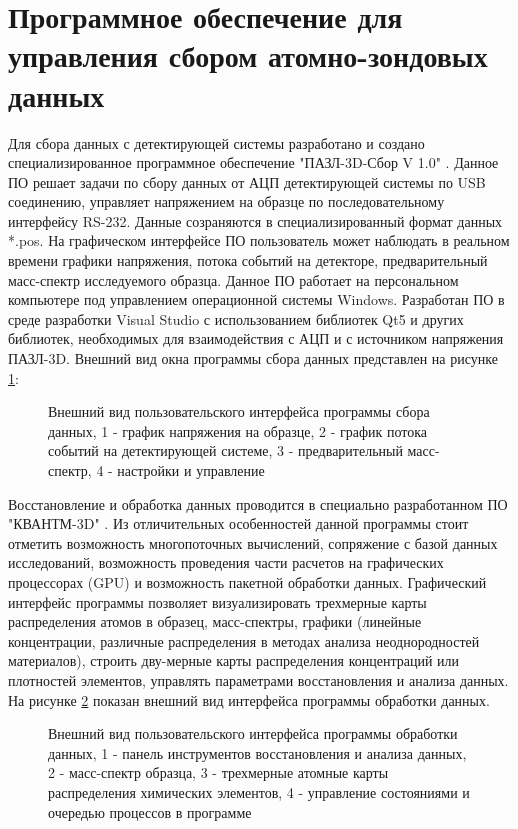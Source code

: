 \FloatBarrier

\section{Программное обеспечение для управления сбором атомно-зондовых данных}\label{sec:ch2/sec5}

Для сбора данных с детектирующей системы разработано и создано специализированное программное обеспечение "ПАЗЛ-3D-Сбор V 1.0" \cite{SBOR}. Данное ПО решает задачи по сбору данных от АЦП детектирующей системы по USB соединению, управляет напряжением на образце по последовательному интерфейсу RS-232. Данные созраняются в специализированный формат данных *.pos. На графическом интерфейсе ПО пользователь может наблюдать в реальном времени графики напряжения, потока событий на детекторе, предварительный масс-спектр исследуемого образца. Данное ПО работает на персональном компьютере под управлением операционной системы Windows. Разработан ПО в среде разработки Visual Studio с использованием библиотек Qt5 и других библиотек, необходимых для взаимодействия с АЦП и с источником напряжения ПАЗЛ-3D. Внешний вид окна программы сбора данных представлен на рисунке \cref{fig:APPLE_sbor}:

\begin{figure}[htb]
	\caption{Внешний вид пользовательского интерфейса программы сбора данных, 1 - график напряжения на образце, 2 - график потока событий на детектирующей системе, 3 - предварительный масс-спектр, 4 - настройки и управление}
	\label{fig:APPLE_sbor}
\end{figure}

Восстановление и обработка данных проводится в специально разработанном ПО "КВАНТМ-3D" \cite{KVANTM}. Из отличительных особенностей данной программы стоит отметить возможность многопоточных вычислений, сопряжение с базой данных исследований, возможность проведения части расчетов на графических процессорах (GPU) и возможность пакетной обработки данных. Графический интерфейс программы позволяет визуализировать трехмерные карты распределения атомов в образец, масс-спектры, графики (линейные концентрации, различные распределения в методах анализа неоднородностей материалов), строить дву-мерные карты распределения концентраций или плотностей элементов, управлять параметрами восстановления и анализа данных. На рисунке \cref{fig:APPLE_kvant} показан внешний вид интерфейса программы обработки данных.

\begin{figure}[htb]
	\caption{Внешний вид пользовательского интерфейса программы обработки данных, 1 - панель инструментов восстановления и анализа данных, 2 - масс-спектр образца, 3 - трехмерные атомные карты распределения химических элементов, 4 - управление состояниями и очередью процессов в программе}
	\label{fig:APPLE_kvant}
\end{figure}

